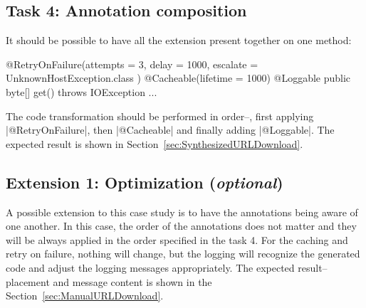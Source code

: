 \subsection{Task 4: Annotation composition}

It should be possible to have all the extension present together on one method:
%
\begin{javacode}
@RetryOnFailure(attempts = 3, delay = 1000, escalate = { UnknownHostException.class })
@Cacheable(lifetime = 1000)
@Loggable
public byte[] get() throws IOException { ... }
\end{javacode}

The code transformation should be performed in order--\Ie, first applying \javainline|@RetryOnFailure|, then \javainline|@Cacheable| and finally adding \javainline|@Loggable|.
The expected result is shown in Section~\ref{sec:SynthesizedURLDownload}.

\subsection{Extension 1: Optimization (\emph{optional})}

A possible extension to this case study is to have the annotations being aware of one another.
In this case, the order of the annotations does not matter and they will be always applied in the order specified in the task 4.
For the caching and retry on failure, nothing will change, but the logging will recognize the generated code and adjust the logging messages appropriately.
The expected result--\Ie placement and message content is shown in the Section~\ref{sec:ManualURLDownload}.